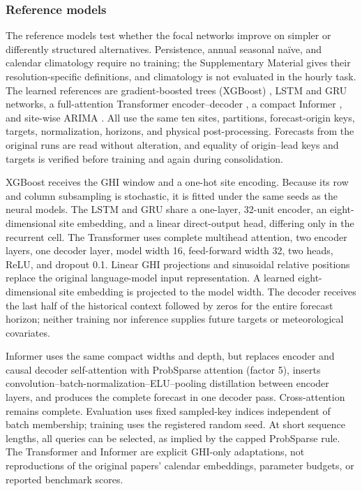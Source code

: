 \subsubsection{Reference models}
\label{sec:additional_baselines}

The reference models test whether the focal networks improve on simpler or
differently structured alternatives. Persistence, annual seasonal na\"ive,
and calendar climatology require no training; the Supplementary Material
gives their resolution-specific definitions, and climatology is not
evaluated in the hourly task. The learned references are gradient-boosted
trees (XGBoost) \cite{chen2016xgboost}, LSTM \cite{hochreiter1997} and GRU
\cite{cho2014gru} networks, a full-attention Transformer
encoder--decoder \cite{vaswani2017attention}, a compact Informer
\cite{zhou2021informer}, and site-wise ARIMA \cite{statsmodels2026arima}.
All use the same ten sites, partitions, forecast-origin keys, targets,
normalization, horizons, and physical post-processing. Forecasts from the
original runs are read without alteration, and equality of origin--lead
keys and targets is verified before training and again during
consolidation.

XGBoost receives the GHI window and a one-hot site encoding. Because its
row and column subsampling is stochastic, it is fitted under the same seeds
as the neural models. The LSTM and GRU share a one-layer, 32-unit encoder,
an eight-dimensional site embedding, and a linear direct-output head,
differing only in the recurrent cell. The Transformer uses complete
multihead attention, two encoder layers, one decoder layer, model width 16,
feed-forward width 32, two heads, ReLU, and dropout 0.1. Linear GHI
projections and sinusoidal relative positions replace the original
language-model input representation. A learned eight-dimensional site
embedding is projected to the model width. The decoder receives the last
half of the historical context followed by zeros for the entire forecast
horizon; neither training nor inference supplies future targets or
meteorological covariates.

Informer uses the same compact widths and depth, but replaces encoder and
causal decoder self-attention with ProbSparse attention (factor 5), inserts
convolution--batch-normalization--ELU--pooling distillation between encoder
layers, and produces the complete forecast in one decoder pass.
Cross-attention remains complete. Evaluation uses fixed sampled-key indices
independent of batch membership; training uses the registered random seed.
At short sequence lengths, all queries can be selected, as implied by the
capped ProbSparse rule. The Transformer and Informer are explicit GHI-only
adaptations, not reproductions of the original papers' calendar
embeddings, parameter budgets, or reported benchmark scores.

